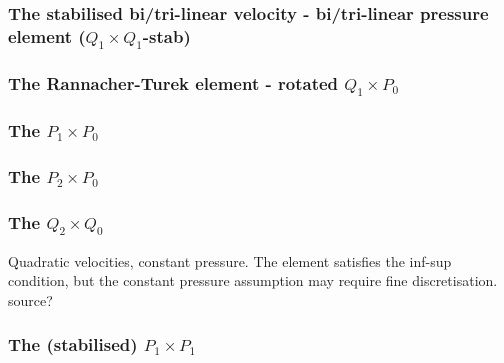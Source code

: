 \subsubsection{The stabilised bi/tri-linear velocity - bi/tri-linear pressure element ($Q_1\times Q_1$-stab)}
\label{ss:pairq1q1stab}



\subsubsection{The Rannacher-Turek element - rotated $Q_1\times P_0$} \label{ss:RTq1p0}




\subsubsection{The $P_1\times P_0$} \label{ss:p1p0}


\subsubsection{The $P_2\times P_0$} \label{ss:p2p0}


\subsubsection{The $Q_2\times Q_0$} \label{ss:pairq2q0}

Quadratic velocities, constant pressure. The element satisfies the inf-sup condition, 
but the constant pressure assumption may require fine discretisation.
source?


\subsubsection{The (stabilised) $P_1\times P_1$} \label{ss:P1P1stab}


